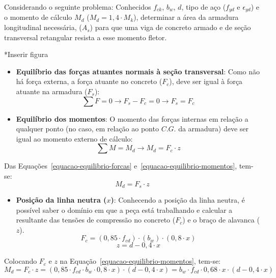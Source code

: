 Considerando o seguinte problema: Conhecidos $f_{ck}$, $b_w$, $d$, tipo de aço ($f_{yd}$ e $\epsilon_{yd}$) e o momento de cálculo $M_d$ ($M_d=1,4\cdot M_k$), determinar a área da armadura longitudinal necessária, ($A_s$) para que uma viga de concreto armado e de seção transversal retangular resista a esse momento fletor.

*Inserir figura
\begin{itemize}
	\item \textbf{Equilíbrio das forças atuantes normais à seção transversal}: Como não há força externa, a força atuante no concreto ($F_c$), deve ser igual à força atuante na armadura ($F_s$):
		\begin{equation}
			\label{equacao-equilibrio-forcas}
			\sum F=0\rightarrow F_s-F_c=0\rightarrow F_s=F_c
		\end{equation}

	\item \textbf{Equilíbrio dos momentos}: O momento das forças internas em relação a qualquer ponto (no caso, em relação ao ponto $C.G.$ da armadura) deve ser igual ao momento externo de cálculo:
		\begin{equation}
			\label{equacao-equilibrio-momentos}
			\sum M=M_d\rightarrow M_d=F_c\cdot z
		\end{equation}
\end{itemize}

Das Equações~\eqref{equacao-equilibrio-forcas} e~\eqref{equacao-equilibrio-momentos}, tem-se:
\begin{equation}
	\label{equacao-momento-de-calculo1}
	M_d=F_s\cdot z
\end{equation}

\begin{itemize}
	\item \textbf{Posição da linha neutra ($x$)}: Conhecendo a posição da linha neutra, é possível saber o domínio em que a peça está trabalhando e calcular a resultante das tensões de compressão no concreto ($F_c$) e o braço de alavanca ($z$).
		\begin{equation}
			\label{equacao-resultante-fc}
			F_c=(0,85\cdot f_{cd})\cdot(b_w)\cdot(0,8\cdot x)
		\end{equation}
		\begin{equation}
			\label{equacao-z}
			z=d-0,4\cdot x
		\end{equation}
\end{itemize}

Colocando $F_c$ e $z$ na Equação~\eqref{equacao-equilibrio-momentos}, tem-se:
\begin{equation}
	M_d=F_c\cdot z=(0,85\cdot f_{cd}\cdot b_w\cdot0,8\cdot x)\cdot(d-0,4\cdot x)=b_w\cdot f_{cd}\cdot0,68\cdot x\cdot(d-0,4\cdot x)
\end{equation}

